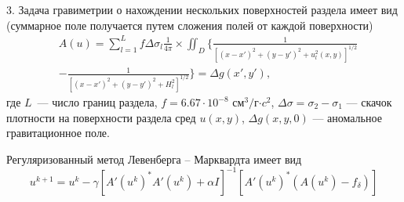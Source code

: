 \documentclass[%
autoref,     %
href,        %
facsimile,   %
colorlinks,  %
]{disser}
\begin{document}
3. Задача гравиметрии о нахождении нескольких поверхностей раздела имеет вид (суммарное поле получается путем сложения полей от каждой поверхности)
\begin{equation}\label{equ_grav_multi}
		\begin{aligned}
		& A(u)=\sum_{l=1}^{L}f\Delta\sigma_l\frac{1}{4\pi}\times 
		\iint_D\bigg\{\frac{1}{[(x-x')^2+(y-y')^2+u_l^2(x,y)]^{1/2}} \\
		&-\frac{1}{[(x-x')^2+(y-y')^2+H_l^2]^{1/2}}\bigg\}=\Delta g(x',y'),
		\end{aligned}
\end{equation}		
где $L$~--- число границ раздела, $f=6.67\cdot10^{-8}$ см$^3/$г$\cdot c^2$, $\Delta\sigma=\sigma_2-\sigma_1$ --- скачок плотности на поверхности раздела сред $u(x,y)$, $\Delta g(x,y,0)$ --- аномальное гравитационное поле.

Регуляризованный метод Левенберга -- Марквардта имеет вид 
$$u^{k+1}=u^k-\gamma[A'(u^k)^*A'(u^k)+\alpha I]^{-1} [A'(u^k)^*(A(u^k)-f_\delta)]$$
\end{document}
